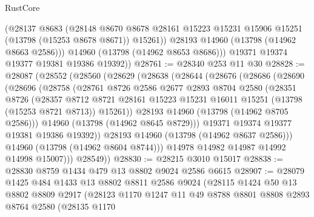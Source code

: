 \begin{lexlean}{RustCore}
\begin{coremodule}
            (@28137
              @8683
              (@28148
                @8670
                @8678
                @28161
                @15223
                @15231
                @15906
                @15251
                (@13798 (@15253 @8678 @8671))
                @15261))
            @28193
            @14960
            (@13798 (@14962 @8663 @2586)))
          @14960
          (@13798 (@14962 @8653 @8686)))
        @19371
        @19374
        @19377
        @19381
        @19386
        @19392))
@28761 := @28340 @253 @11 @30
@28828 := @28087
    (@28552
      (@28560
        (@28629
          (@28638
            (@28644
              (@28676
                (@28686
                  (@28690
                    (@28696
                      (@28758
                        (@28761
                          @8726
                          @2586
                          @2677
                          @2893
                          @8704
                          @2580
                          (@28351
                            @8726
                            (@28357
                              @8712
                              @8721
                              @28161
                              @15223
                              @15231
                              @16011
                              @15251
                              (@13798 (@15253 @8721 @8713))
                              @15261))
                          @28193
                          @14960
                          (@13798 (@14962 @8705 @2586)))
                        @14960
                        (@13798 (@14962 @8645 @8729)))
                      @19371
                      @19374
                      @19377
                      @19381
                      @19386
                      @19392))
                  @28193
                  @14960
                  (@13798 (@14962 @8637 @2586)))
                @14960
                (@13798 (@14962 @8604 @8744)))
              @14978
              @14982
              @14987
              @14992
              @14998
              @15007)))
        @28549))
@28830 := @28215 @3010 @15017
@28838 := @28830 @8759 @1434 @479 @13 @8802 @9024 @2586 @6615
@28907 := @28079
    @1425
    @484
    @1433
    @13
    @8802
    @8811
    @2586
    @9024
    (@28115
      @1424
      @50
      @13
      @8802
      @8809
      @2917
      (@28123
        @1170
        @1247
        @11
        @49
        @8788
        @8801
        @8808
        @2893
        @8764
        @2580
        (@28135
          @1170

\end{coremodule}
\end{lexlean}
